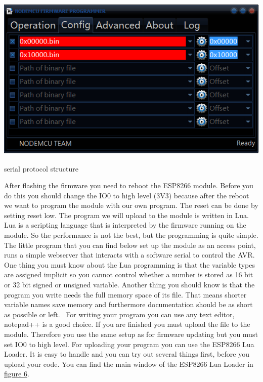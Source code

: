 \begin{DoxyImage}
\includegraphics[width=\textwidth,height=\textheight/2,keepaspectratio=true]{NodeMCUFlasher_config.PNG}
\caption{serial protocol structure}
\end{DoxyImage}
After flashing the firmware you need to reboot the E\+S\+P8266 module. Before you do this you should change the I\+O0 to high level (3\+V3) because after the reboot we want to program the module with our own program. The reset can be done by setting reset low. The program we will upload to the module is written in Lua. Lua is a scripting language that is interpreted by the firmware running on the module. So the performance is not the best, but the programming is quite simple. The little program that you can find below set up the module as an access point, runs a simple webserver that interacts with a software serial to control the A\+V\+R. One thing you must know about the Lua programming is that the variable types are assigned implicit so you cannot control whether a number is stored as 16 bit or 32 bit signed or unsigned variable. Another thing you should know is that the program you write needs the full memory space of its file. That means shorter variable names save memory and furthermore documentation should be as short as possible or left.~\newline
 For writing your program you can use any text editor, notepad++ is a good choice. If you are finished you must upload the file to the module. Therefore you use the same setup as for firmware updating but you must set I\+O0 to high level. For uploading your program you can use the E\+S\+P8266 Lua Loader. It is easy to handle and you can try out several things first, before you upload your code. You can find the main window of the E\+S\+P8266 Lua Loader in \hyperlink{index_six}{figure 6}. \label{index_six}%
\hypertarget{index_six}{}%

